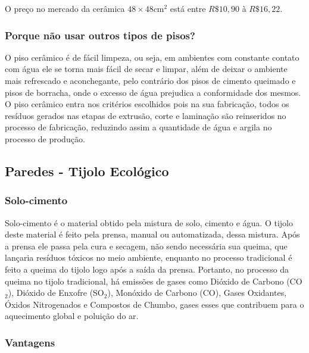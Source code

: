 	O preço no mercado da cerâmica $48\times48 c\si{\meter}^{2}$ está entre $R\$ 10,90$ à $R\$ 16,22$.

\subsubsection*{\textbf{Porque não usar outros tipos de pisos?}}

	O piso cerâmico é de fácil limpeza, ou seja, em ambientes com constante contato com água ele se torna mais fácil de secar e limpar, além de deixar o ambiente mais refrescado e aconchegante, pelo contrário dos pisos de cimento queimado e pisos de borracha, onde o excesso de água prejudica a conformidade dos mesmos. O piso cerâmico entra nos critérios escolhidos pois na sua fabricação, todos os resíduos gerados nas etapas de extrusão, corte e laminação são reinseridos no processo de fabricação, reduzindo assim a quantidade de água e argila no processo de produção.


\subsection{Paredes - Tijolo Ecológico }

\subsubsection*{\textbf{Solo-cimento}}
	
	Solo-cimento é o material obtido pela mistura de solo, cimento e água. O tijolo deste material é feito pela prensa, manual ou automatizada, dessa mistura. Após a prensa ele passa pela cura e secagem, não sendo necessária sua queima, que lançaria resíduos tóxicos no meio ambiente, enquanto no processo tradicional é feito a queima do tijolo logo após a saída da prensa. Portanto, no processo da queima no tijolo tradicional, há emissões de gases como Dióxido de Carbono (CO$_2$), Dióxido de Enxofre (SO$_2$), Monóxido de Carbono (CO), Gases Oxidantes, Óxidos Nitrogenados e Compostos de Chumbo, gases esses que contribuem para o aquecimento global e poluição do ar\cite{1980PORTLAND}.\\

\subsubsection*{\textbf{Vantagens}}
	
